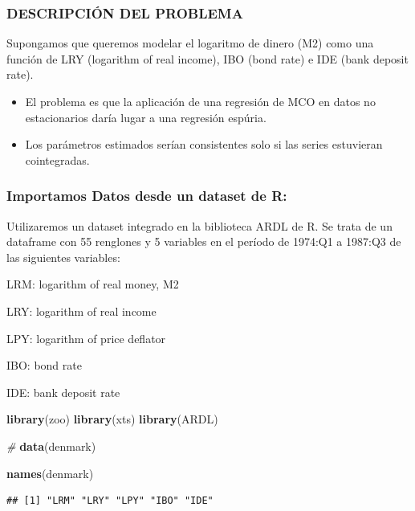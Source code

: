 \documentclass[
]{book}
\newenvironment{Shaded}{\begin{snugshade}}{\end{snugshade}}
\newcommand{\CommentTok}[1]{\textcolor[rgb]{0.56,0.35,0.01}{\textit{#1}}}
\newcommand{\FunctionTok}[1]{\textcolor[rgb]{0.13,0.29,0.53}{\textbf{#1}}}
\newcommand{\NormalTok}[1]{#1}
\begin{document}
\hypertarget{descripciuxf3n-del-problema}{%
\subsubsection{DESCRIPCIÓN DEL PROBLEMA}\label{descripciuxf3n-del-problema}}

Supongamos que queremos modelar el logaritmo de dinero (M2) como una función de LRY (logarithm of real income), IBO (bond rate) e IDE (bank deposit rate).

\begin{itemize}
\item
  El problema es que la aplicación de una regresión de MCO en datos no estacionarios daría lugar a una regresión espúria.
\item
  Los parámetros estimados serían consistentes solo si las series estuvieran cointegradas.
\end{itemize}

\hypertarget{importamos-datos-desde-un-dataset-de-r}{%
\subsubsection{Importamos Datos desde un dataset de R:}\label{importamos-datos-desde-un-dataset-de-r}}

Utilizaremos un dataset integrado en la biblioteca ARDL de R. Se trata de un dataframe con 55 renglones y 5 variables en el período de 1974:Q1 a 1987:Q3 de las siguientes variables:

LRM: logarithm of real money, M2

LRY: logarithm of real income

LPY: logarithm of price deflator

IBO: bond rate

IDE: bank deposit rate

\begin{Shaded}
\begin{Highlighting}[]
\FunctionTok{library}\NormalTok{(zoo) }
\FunctionTok{library}\NormalTok{(xts) }
\FunctionTok{library}\NormalTok{(ARDL)}

\CommentTok{\#}
\FunctionTok{data}\NormalTok{(denmark)}

\FunctionTok{names}\NormalTok{(denmark)}
\end{Highlighting}
\end{Shaded}

\begin{verbatim}
## [1] "LRM" "LRY" "LPY" "IBO" "IDE"
\end{verbatim}
\end{document}
